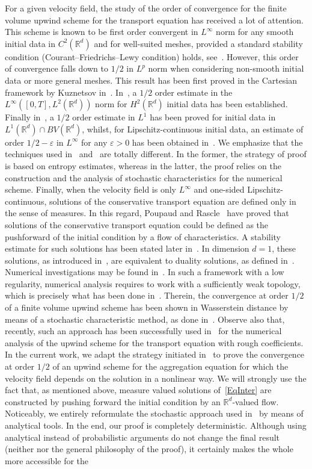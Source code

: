 \documentclass[11pt]{article}
\theoremstyle{definition}
\numberwithin{equation}{section}
\newcommand*\RR{\mathbb{R}}
\newcommand*\eps{\varepsilon}
\begin{document}
For a given velocity field, the study of the order of convergence for the finite volume upwind scheme for the transport equation has received a lot of attention. This scheme is known to be first order convergent in $L^\infty$ norm for any smooth initial data in $C^2(\RR^d)$ and for well-suited meshes, provided a standard stability condition (Courant--Friedrichs--Lewy condition) holds, see~\cite{bouche}. However, this order of convergence falls down to $1/2$ in $L^p$ norm when considering non-smooth initial data or more general meshes. This result has been first proved in the Cartesian framework by Kuznetsov in~\cite{Kuznetsov}. In~\cite{Despres}, a $1/2$ order estimate in the $L^\infty([0,T],L^2(\RR^d))$ norm for $H^2(\RR^d)$ initial data has been established. Finally in~\cite{caniveau,MV}, a $1/2$ order estimate in $L^1$ has been proved for initial data in $L^1(\RR^d)\cap BV(\RR^d)$, whilst, for Lipschitz-continuous initial data, an estimate of order $1/2-\eps$ in $L^\infty$ for any $\eps>0$ has been obtained in~\cite{caniveau,M}. We emphasize that the techniques used in~\cite{M,MV} and~\cite{caniveau} are totally different. In the former, the strategy of proof is based on entropy estimates, whereas in the latter, the proof relies on the construction and the analysis of stochastic characteristics for the numerical scheme. Finally, when the velocity field is only $L^\infty$ and one-sided Lipschitz-continuous, solutions of the conservative transport equation are defined only in the sense of measures. In this regard, Poupaud and Rascle~\cite{PoupaudRascle} have proved that solutions of the conservative transport equation could be defined as the pushforward of the initial condition by a flow of characteristics. A stability estimate for such solutions has been stated later in~\cite{Bianchini}. In dimension $d=1$, these solutions, as introduced in~\cite{PoupaudRascle}, are equivalent to duality solutions, as defined in~\cite{bj1}. Numerical investigations may be found in~\cite{GJ}. In such a framework with a low regularity, numerical analysis requires to work with a sufficiently weak topology, which is precisely what has been done in~\cite{DLV}. Therein, the convergence at order $1/2$ of a finite volume upwind scheme has been shown in Wasserstein distance by means of a stochastic characteristic method, as done in~\cite{caniveau}. Observe also that, recently, such an approach has been successfully used in~\cite{schlichting} for the numerical analysis of the upwind scheme for the transport equation with rough coefficients. In the current work, we adapt the strategy initiated in~\cite{DLV} to prove the convergence at order $1/2$ of an upwind scheme for the aggregation equation for which the velocity field depends on the solution in a nonlinear way. We will strongly use the fact that, as mentioned above, measure valued solutions of~\eqref{EqInter} are constructed by pushing forward the initial condition by an $\RR^d$-valued flow. Noticeably, we entirely reformulate the stochastic approach used in~\cite{DLV} by means of analytical tools. In the end, our proof is completely deterministic. Although using analytical instead of probabilistic arguments do not change the final result (neither nor the general philosophy of the proof), it certainly makes the whole more accessible for the 
\end{document}
